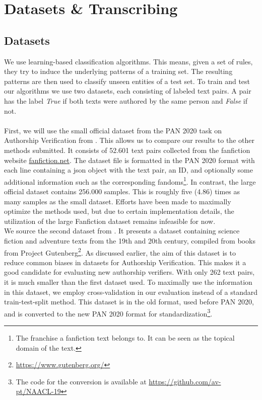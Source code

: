 \chapter{Datasets \& Transcribing}\label{ch:datasets}
\section{Datasets}
We use learning-based classification algorithms.
This means, given a set of rules, they try to induce the underlying patterns of a training set.
The resulting patterns are then used to classify unseen entities of a test set.
To train and test our algorithms we use two datasets, each consisting of labeled text pairs.
A pair has the label \textit{True} if both texts were authored by the same person and \textit{False} if not.\\\\
First, we will use the small official dataset from the PAN 2020 task on Authorship Verification from \cite{bevendorff2020overview}.
This allows us to compare our results to the other methods submitted.
It consists of 52.601 text pairs collected from the fanfiction website \url{fanfiction.net}.
The dataset file is formatted in the PAN 2020 format with each line containing a json object with the text pair, an ID, and optionally some additional information such as the corresponding fandoms\footnote{The franchise a fanfiction text belongs to. It can be seen as the topical domain of the text.}.
In contrast, the large official dataset contains 256.000 samples.
This is roughly five (4.86) times as many samples as the small dataset.
Efforts have been made to maximally optimize the methods used, but due to certain implementation details, the utilization of the large Fanfiction dataset remains infeasible for now.\\
We source the second dataset from \cite{stein2019unbiasedGutenbergCorpus}.
It presents a dataset containing science fiction and adventure texts from the 19th and 20th century, compiled from books from Project Gutenberg\footnote{\url{https://www.gutenberg.org/}}.
As discussed earlier, the aim of this dataset is to reduce common biases in datasets for Authorship Verification.
This makes it a good candidate for evaluating new authorship verifiers.
With only 262 text pairs, it is much smaller than the first dataset used.
To maximally use the information in this dataset, we employ cross-validation in our evaluation instead of a standard train-test-split method.
This dataset is in the old format, used before PAN 2020, and is converted to the new PAN 2020 format for standardization\footnote{The code for the conversion is available at \url{https://github.com/av-pt/NAACL-19}}.\\

